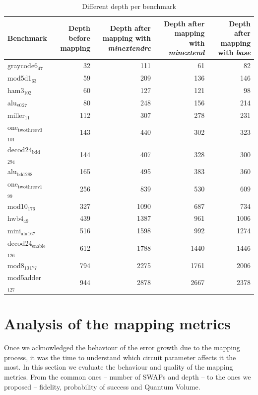\begin{table}[htbp]
\caption{\label{tab:depth_per_bench}
Different depth per benchmark}
\centering
\tiny
\begin{tabular}{lrrrr}
\hline
Benchmark & Depth before mapping & Depth after mapping with \emph{minextendrc} & Depth after mapping with \emph{minextend} & Depth after mapping with \emph{base}\\
\hline
graycode6\(_{\text{47}}\) & 32 & 111 & 61 & 82\\
mod5d1\(_{\text{63}}\) & 59 & 209 & 136 & 146\\
ham3\(_{\text{102}}\) & 60 & 127 & 121 & 98\\
alu\(_{\text{v0}}\)\(_{\text{27}}\) & 80 & 248 & 156 & 214\\
miller\(_{\text{11}}\) & 112 & 307 & 278 & 231\\
one\(_{\text{two}}\)\(_{\text{three}}\)\(_{\text{v3}}\)\(_{\text{101}}\) & 143 & 440 & 302 & 323\\
decod24\(_{\text{bdd}}\)\(_{\text{294}}\) & 144 & 407 & 328 & 300\\
alu\(_{\text{bdd}}\)\(_{\text{288}}\) & 165 & 495 & 383 & 360\\
one\(_{\text{two}}\)\(_{\text{three}}\)\(_{\text{v1}}\)\(_{\text{99}}\) & 256 & 839 & 530 & 609\\
mod10\(_{\text{176}}\) & 327 & 1090 & 687 & 734\\
hwb4\(_{\text{49}}\) & 439 & 1387 & 961 & 1006\\
mini\(_{\text{alu}}\)\(_{\text{167}}\) & 516 & 1598 & 992 & 1274\\
decod24\(_{\text{enable}}\)\(_{\text{126}}\) & 612 & 1788 & 1440 & 1446\\
mod8\(_{\text{10}}\)\(_{\text{177}}\) & 794 & 2275 & 1761 & 2006\\
mod5adder\(_{\text{127}}\) & 944 & 2878 & 2667 & 2378\\
\hline
\end{tabular}
\end{table}

\section{Analysis of the mapping metrics}
\label{sec:org7e0d207}
Once we acknowledged the behaviour of the error growth due to the mapping process, it was the time to understand which circuit parameter affects it the most.
In this section we evaluate the behaviour and quality of the mapping metrics.
From the common ones -- number of SWAPs and depth -- to the ones we proposed -- fidelity, probability of success and Quantum Volume.



